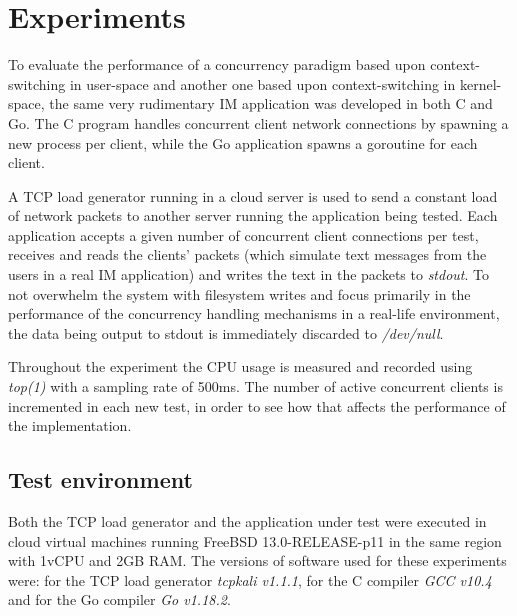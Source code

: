 \section{Experiments}
To evaluate the performance of a concurrency paradigm based upon context-switching in user-space and another one based upon context-switching in kernel-space, the same very rudimentary IM application was developed in both C and Go. The C program handles concurrent client network connections by spawning a new process per client, while the Go application spawns a goroutine for each client. 

A TCP load generator running in a cloud server is used to send a constant load of network packets to another server running the application being tested. Each application accepts a given number of concurrent client connections per test, receives and reads the clients' packets (which simulate text messages from the users in a real IM application) and writes the text in the packets to \textit{stdout}. To not overwhelm the system with filesystem writes and focus primarily in the performance of the concurrency handling mechanisms in a real-life environment, the data being output to stdout is immediately discarded to \textit{/dev/null}. 

Throughout the experiment the CPU usage is measured and recorded using \textit{top(1)} with a sampling rate of 500ms. The number of active concurrent clients is incremented in each new test, in order to see how that affects the performance of the implementation.

\subsection{Test environment}
Both the TCP load generator and the application under test were executed in cloud virtual machines running FreeBSD 13.0-RELEASE-p11 in the same region with 1vCPU and 2GB RAM. The versions of software used for these experiments were: for the TCP load generator \textit{tcpkali v1.1.1}, for the C compiler \textit{GCC v10.4} and for the Go compiler \textit{Go v1.18.2}.

